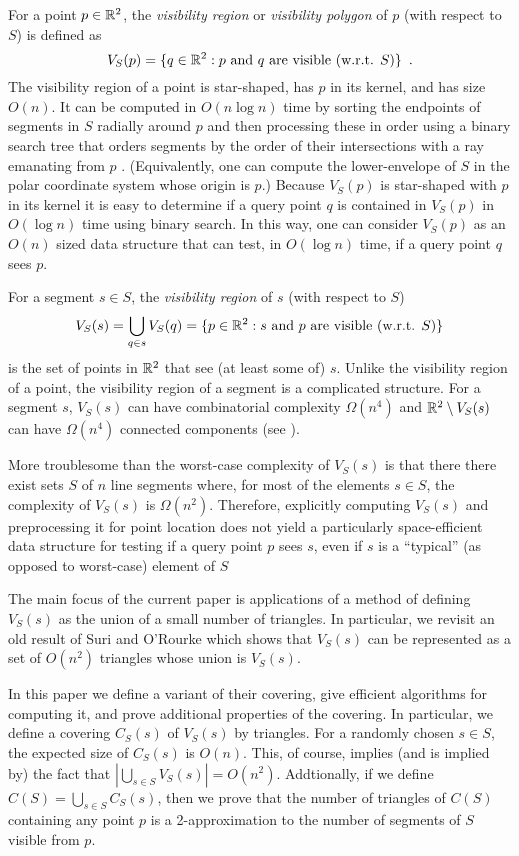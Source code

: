\documentclass{patmorin}
\begin{document}
For a point $p\in\mathbb{R}^2$, the \emph{visibility region} or \emph{visibility
polygon} of $p$ (with respect to $S$) is defined as
\[
   V_S(p)=\{q\in\mathbb{R}^2:\mbox{$p$ and $q$ are visible (w.r.t. $S$)}\} 
      \enspace .
\]
The visibility region of a point is star-shaped, has $p$ in its
kernel, and has size $O(n)$. It can be computed in $O(n\log n)$ time
by sorting the endpoints of segments in $S$ radially around $p$ and
then processing these in order using a binary search tree that orders
segments by the order of their intersections with a ray emanating from $p$
\cite{a85,so84}. (Equivalently, one can compute the lower-envelope of $S$
in the polar coordinate system whose origin is $p$.)  Because $V_S(p)$
is star-shaped with $p$ in its kernel it is easy to determine if a query
point $q$ is contained in $V_S(p)$ in $O(\log n)$ time using binary
search. In this way, one can consider $V_S(p)$ as an $O(n)$ sized data
structure that can test, in $O(\log n)$ time, if a query point $q$
sees $p$.

For a segment $s\in S$, the \emph{visibility region} of $s$ (with respect
to $S$)
\[
   V_S(s) = \bigcup_{q\in s} V_S(q)
          = \{p\in\mathbb{R}^2:\mbox{$s$ and $p$ are visible (w.r.t. $S$)} \}
\]
is the set of points in $\mathbb{R}^2$ that see (at least some of) $s$.  Unlike
the visibility region of a point, the visibility region of a segment is a
complicated structure.  For a segment $s$, $V_S(s)$ can have combinatorial
complexity $\Omega(n^4)$ and $\mathbb{R}^2\setminus V_S(s)$ can have $\Omega(n^4)$
connected components \cite[Figure~8.13]{o87}\cite[Lemma~12]{fhjmz08}
(see ).

More troublesome than the worst-case complexity of $V_S(s)$ is that
there there exist sets $S$ of $n$ line segments where, for most of
the elements $s\in S$, the complexity of $V_S(s)$ is $\Omega(n^2)$.
Therefore, explicitly computing $V_S(s)$ and preprocessing it for point
location does not yield a particularly space-efficient data structure
for testing if a query point $p$ sees $s$, even if $s$ is a ``typical''
(as opposed to worst-case) element of $S$

The main focus of the current paper is applications of a method
of defining $V_S(s)$ as the union of a small number of triangles.
In particular, we revisit an old result of Suri and O'Rourke \cite{so84}
which shows that $V_S(s)$ can be represented as a set of $O(n^2)$
triangles whose union is $V_S(s)$.

In this paper we define a variant of their covering, give efficient
algorithms for computing it, and prove additional properties of the
covering. In particular, we define a covering $C_S(s)$ of $V_S(s)$
by triangles.  For a randomly chosen $s\in S$, the expected size of
$C_S(s)$ is $O(n)$.  This, of course, implies (and is implied by)
the fact that $|\bigcup_{s\in S} V_S(s)|=O(n^2)$.  Addtionally, if we
define $C(S)=\bigcup_{s\in S} C_S(s)$, then we prove that the number
of triangles of $C(S)$ containing any point $p$ is a 2-approximation to
the number of segments of $S$ visible from $p$.
\end{document}
